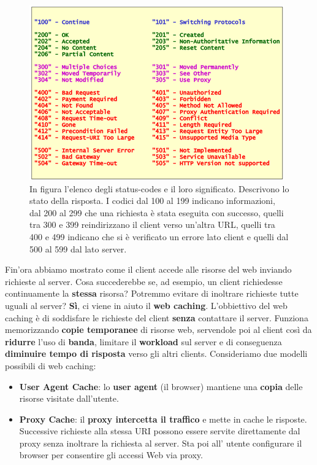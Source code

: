 \documentclass[11pt,a4paper,oneside]{book}
\theoremstyle{definition}
\begin{document}
\begin{figure}[!h]
	\includegraphics[scale=0.5]{Immagini/Stat_code.png}
	\centering
	\caption{In figura l'elenco degli status-codes e il loro significato. Descrivono lo stato della risposta. I codici dal 100 al 199 indicano informazioni, dal 200 al 299 che una richiesta è stata eseguita con successo, quelli tra 300 e 399 reindirizzano il client verso un'altra URL, quelli tra 400 e 499 indicano che si è verificato un errore lato client e quelli dal 500 al 599 dal lato server.}
\end{figure}

\pagebreak

Fin'ora abbiamo mostrato come il client accede alle risorse del web inviando richieste al server. Cosa succederebbe se, ad esempio, un client richiedesse continuamente la \textbf{stessa} risorsa? Potremmo evitare di inoltrare richieste tutte uguali al server?\newline
\textbf{Sì}, ci viene in aiuto il \textbf{web caching}. L'obbiettivo del web caching è di soddisfare le richieste del client \textbf{senza} contattare il server. Funziona memorizzando \textbf{copie temporanee} di risorse web, servendole poi al client così da \textbf{ridurre} l’uso di \textbf{banda}, limitare il \textbf{workload} sul server e di conseguenza \textbf{diminuire tempo di risposta} verso gli altri clients.\newline
Consideriamo due modelli possibili di web caching:
\begin{itemize}
	\item \textbf{User Agent Cache}: lo \textbf{user agent} (il browser) mantiene una \textbf{copia} delle risorse visitate dall’utente.
	\item \textbf{Proxy Cache}: il \textbf{proxy intercetta il traffico} e mette in cache le risposte. Successive richieste alla stessa URI possono essere servite direttamente dal proxy senza inoltrare la richiesta al server. Sta poi all' utente configurare il browser per consentire gli accessi Web via proxy.
\end{itemize}
\end{document}
